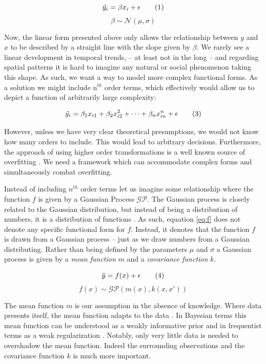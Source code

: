 \documentclass[a4paper]{article}
\begin{document}
\[
\Tilde{y_i} = \beta x_i + \epsilon  \tag{1} \label{eq:lin}
\]
\[
\beta \sim \mathcal{N}(\mu,\sigma)  \tag{2} \label{eq:beta}
\]

Now, the linear form presented above only allows the relationship between $y$ and $x$ to be described by a straight line with the slope given by $\beta$. We rarely see a linear development in temporal trends, -- at least not in the long -- and regarding spatial patterns it is hard to imagine any natural or social phenomenon taking this shape. As such, we want a way to model more complex functional forms. As a solution we might include n$^{th}$ order terms, which effectively would allow us to depict a function of arbitrarily large complexity:\par

\[
\Tilde{y_i} = \beta_1 x_{i1} + \beta_2 x_{i2}^2 + \dots + \beta_n x_{in}^n + \epsilon  \tag{3} \label{eq:orders}
\]

However, unless we have very clear theoretical presumptions, we would not know how many orders to include. This would lead to arbitrary decisions. Furthermore, the approach of using higher order transformations is a well known source of overfitting \citep[2]{williams2006gaussian}. We need a framework which can accommodate complex forms and simultaneously combat overfitting.\par

Instead of including $n^{th}$ order terms let us imagine some relationship where the function $f$ is given by a Gaussian Process $\mathcal{GP}$. The Gaussian process is closely related to the Gaussian distribution, but instead of being a distribution of numbers, it is a distribution of functions \citep[13-15]{williams2006gaussian}. As such, equation \ref{eq:f} does not denote any specific functional form for $f$. Instead, it denotes that the function $f$ is drawn from a Gaussian process -- just as we draw numbers from a Gaussian distributing. Rather than being defined by the parameters $\mu$ and $\sigma$ a Gaussian process is given by a \emph{mean function} $m$ and a \emph{covariance function} $k$.\par

\[
\Tilde{y} = f(x) + \epsilon  \tag{4} \label{eq:y}
\]
\[
f(x) \sim \mathcal{GP}(m(x),k(x,x'))  \tag{5} \label{eq:f}
\]

The mean function $m$ is our assumption in the absence of knowledge. Where data presents itself, the mean function adapts to the data \citep[3-4]{williams2006gaussian}. In Bayesian terms this mean function can be understood as a weakly informative prior and in frequentist terms as a weak regularization \citep[35]{Mcelreath_2018}. Notably, only very little data is needed to overshadow the mean function. Indeed the surrounding observations and the covariance function $k$ is much more important.\par
\end{document}
